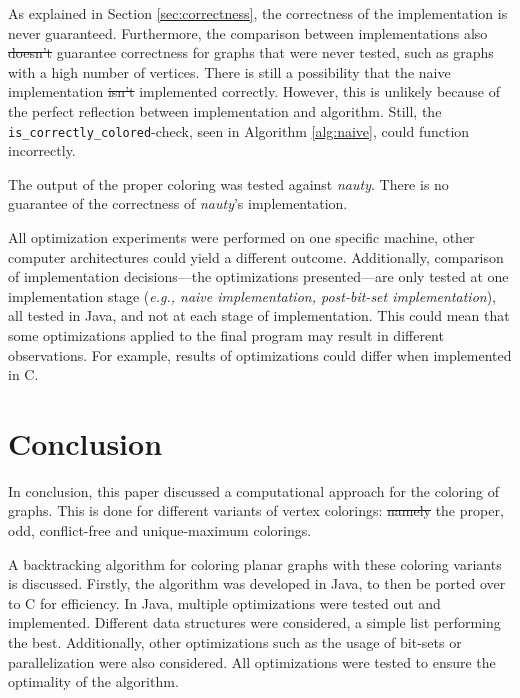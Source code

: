 \documentclass{article}
\providecommand{\DIFaddtex}[1]{{\protect\color{blue}\uwave{#1}}} %
\providecommand{\DIFdeltex}[1]{{\protect\color{red}\sout{#1}}}                      %
\providecommand{\DIFaddbegin}{} %
\providecommand{\DIFaddend}{} %
\providecommand{\DIFdelbegin}{} %
\providecommand{\DIFdelend}{} %
\providecommand{\DIFadd}[1]{\texorpdfstring{\DIFaddtex{#1}}{#1}} %
\providecommand{\DIFdel}[1]{\texorpdfstring{\DIFdeltex{#1}}{}} %
\newcommand{\DIFscaledelfig}{0.5}
\newlength{\DIFdelgraphicswidth} %
\newlength{\DIFdelgraphicsheight} %
\newcommand{\DIFaddincludegraphics}[2][]{{\color{blue}\fbox{\DIFOincludegraphics[#1]{#2}}}} %
\newcommand{\DIFdelincludegraphics}[2][]{%
\sbox{\DIFdelgraphicsbox}{\DIFOincludegraphics[#1]{#2}}%
\settoboxwidth{\DIFdelgraphicswidth}{\DIFdelgraphicsbox} %
\settoboxtotalheight{\DIFdelgraphicsheight}{\DIFdelgraphicsbox} %
\scalebox{\DIFscaledelfig}{%
\parbox[b]{\DIFdelgraphicswidth}{\usebox{\DIFdelgraphicsbox}\\[-\baselineskip] \rule{\DIFdelgraphicswidth}{0em}}\llap{\resizebox{\DIFdelgraphicswidth}{\DIFdelgraphicsheight}{%
\setlength{\unitlength}{\DIFdelgraphicswidth}%
\begin{picture}(1,1)%
\thicklines\linethickness{2pt} %
{\color[rgb]{1,0,0}\put(0,0){\framebox(1,1){}}}%
{\color[rgb]{1,0,0}\put(0,0){\line( 1,1){1}}}%
{\color[rgb]{1,0,0}\put(0,1){\line(1,-1){1}}}%
\end{picture}%
}\hspace*{3pt}}} %
} %
\DeclareRobustCommand{\DIFaddbegin}{\DIFOaddbegin \let\includegraphics\DIFaddincludegraphics} %
\DeclareRobustCommand{\DIFaddend}{\DIFOaddend \let\includegraphics\DIFOincludegraphics} %
\DeclareRobustCommand{\DIFdelbegin}{\DIFOdelbegin \let\includegraphics\DIFdelincludegraphics} %
\DeclareRobustCommand{\DIFdelend}{\DIFOaddend \let\includegraphics\DIFOincludegraphics} %
\begin{document}
As explained in Section \ref{sec:correctness}, the correctness of the implementation is never guaranteed. Furthermore, the comparison between implementations also \DIFdelbegin \DIFdel{doesn't }\DIFdelend \DIFaddbegin \DIFadd{does not }\DIFaddend guarantee correctness for graphs that were never tested, such as graphs with a high number of vertices. 
There is still a possibility that the naive implementation \DIFdelbegin \DIFdel{isn't }\DIFdelend \DIFaddbegin \DIFadd{is not }\DIFaddend implemented correctly. However, this is unlikely because of the perfect reflection between implementation and algorithm. Still, the \texttt{is\_correctly\_colored}-check, seen in Algorithm \ref{alg:naive}, could function incorrectly.

The output of the proper coloring was tested against \textit{nauty}. There is no guarantee of the correctness of \textit{nauty}'s implementation.

All optimization experiments were performed on one specific machine, other computer architectures could yield a different outcome. 
Additionally, comparison of implementation decisions---the optimizations presented---are only tested at one implementation stage (\textit{e.g., naive implementation, post-bit-set implementation}), all tested in Java, and not at each stage of implementation. This could mean that some optimizations applied to the final program may result in different observations. For example, results of optimizations could differ when implemented in C.

\section{Conclusion}
\label{sec:conclusion}

In conclusion, this paper discussed a computational approach for the coloring of graphs. This is done for different variants of vertex colorings: \DIFdelbegin \DIFdel{namely }\DIFdelend the proper, odd, conflict-free and unique-maximum colorings. 

A backtracking algorithm for coloring planar graphs with these coloring variants is discussed. Firstly, the algorithm was developed in Java, to then be ported over to C for efficiency. In Java, multiple optimizations were tested out and implemented. Different data structures were considered, a simple list performing the best. Additionally, other optimizations such as the usage of bit-sets or parallelization were also considered. 
All optimizations were tested to ensure the optimality of the algorithm.
\end{document}
